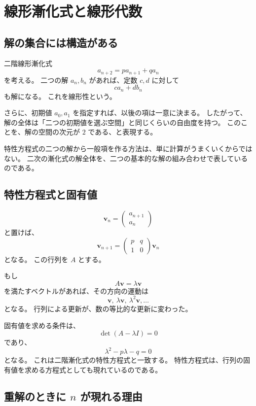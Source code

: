 
\section{線形漸化式と線形代数}

\subsection{解の集合には構造がある}

二階線形漸化式
\[
  a_{n+2}=pa_{n+1}+qa_n
\]
を考える。
二つの解 $a_n,b_n$ があれば、定数 $c,d$ に対して
\[
  c a_n+d b_n
\]
も解になる。
これを線形性という。

さらに、初期値 $a_0,a_1$ を指定すれば、以後の項は一意に決まる。
したがって、解の全体は「二つの初期値を選ぶ空間」と同じくらいの自由度を持つ。
このことを、解の空間の次元が $2$ である、と表現する。

特性方程式の二つの解から一般項を作る方法は、単に計算がうまくいくからではない。
二次の漸化式の解全体を、二つの基本的な解の組み合わせで表しているのである。

\subsection{特性方程式と固有値}

\[
  \boldsymbol v_n=
  \begin{pmatrix}a_{n+1}\\a_n\end{pmatrix}
\]
と置けば、
\[
  \boldsymbol v_{n+1}
  =
  \begin{pmatrix}p&q\\1&0\end{pmatrix}
  \boldsymbol v_n
\]
となる。
この行列を $A$ とする。

もし
\[
  A\boldsymbol v=\lambda\boldsymbol v
\]
を満たすベクトルがあれば、その方向の運動は
\[
  \boldsymbol v,\ \lambda\boldsymbol v,\ \lambda^2\boldsymbol v,\ldots
\]
となる。
行列による更新が、数の等比的な更新に変わった。

固有値を求める条件は、
\[
  \det(A-\lambda I)=0
\]
であり、
\[
  \lambda^2-p\lambda-q=0
\]
となる。
これは二階漸化式の特性方程式と一致する。
特性方程式は、行列の固有値を求める方程式としても現れているのである。

\subsection{重解のときに $n$ が現れる理由}

